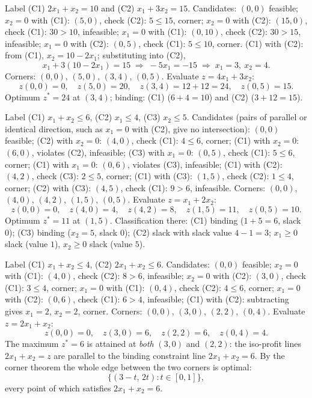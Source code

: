 \begin{solutions}
  \item Label (C1) $2x_{1}+x_{2}=10$ and (C2) $x_{1}+3x_{2}=15$.
        Candidates: $(0,0)$ feasible; $x_{2}=0$ with (C1): $(5,0)$,
        check (C2): $5\le 15$, corner; $x_{2}=0$ with (C2): $(15,0)$,
        check (C1): $30>10$, infeasible; $x_{1}=0$ with (C1): $(0,10)$,
        check (C2): $30>15$, infeasible; $x_{1}=0$ with (C2): $(0,5)$,
        check (C1): $5\le 10$, corner. (C1) with (C2): from (C1),
        $x_{2}=10-2x_{1}$; substituting into (C2),
        \[
          x_{1}+3(10-2x_{1})=15
          \;\Longrightarrow\; -5x_{1}=-15
          \;\Longrightarrow\; x_{1}=3,\ x_{2}=4 .
        \]
        Corners: $(0,0)$, $(5,0)$, $(3,4)$, $(0,5)$. Evaluate
        $z=4x_{1}+3x_{2}$:
        \[
          z(0,0)=0,\quad z(5,0)=20,\quad z(3,4)=12+12=24,\quad
          z(0,5)=15 .
        \]
        Optimum $z^{*}=24$ at $(3,4)$; binding: (C1) ($6+4=10$) and
        (C2) ($3+12=15$).

  \item Label (C1) $x_{1}+x_{2}\le 6$, (C2) $x_{1}\le 4$, (C3)
        $x_{2}\le 5$. Candidates (pairs of parallel or identical
        direction, such as $x_{1}=0$ with (C2), give no intersection):
        $(0,0)$ feasible; (C2) with $x_{2}=0$: $(4,0)$, check (C1):
        $4\le 6$, corner; (C1) with $x_{2}=0$: $(6,0)$, violates (C2),
        infeasible; (C3) with $x_{1}=0$: $(0,5)$, check (C1): $5\le 6$,
        corner; (C1) with $x_{1}=0$: $(0,6)$, violates (C3), infeasible;
        (C1) with (C2): $(4,2)$, check (C3): $2\le 5$, corner; (C1) with
        (C3): $(1,5)$, check (C2): $1\le 4$, corner; (C2) with (C3):
        $(4,5)$, check (C1): $9>6$, infeasible. Corners: $(0,0)$,
        $(4,0)$, $(4,2)$, $(1,5)$, $(0,5)$. Evaluate $z=x_{1}+2x_{2}$:
        \[
          z(0,0)=0,\quad z(4,0)=4,\quad z(4,2)=8,\quad z(1,5)=11,\quad
          z(0,5)=10 .
        \]
        Optimum $z^{*}=11$ at $(1,5)$. Classification there: (C1)
        binding ($1+5=6$, slack $0$); (C3) binding ($x_{2}=5$, slack
        $0$); (C2) slack with slack value $4-1=3$; $x_{1}\ge 0$ slack
        (value $1$), $x_{2}\ge 0$ slack (value $5$).

  \item Label (C1) $x_{1}+x_{2}\le 4$, (C2) $2x_{1}+x_{2}\le 6$.
        Candidates: $(0,0)$ feasible; $x_{2}=0$ with (C1): $(4,0)$,
        check (C2): $8>6$, infeasible; $x_{2}=0$ with (C2): $(3,0)$,
        check (C1): $3\le 4$, corner; $x_{1}=0$ with (C1): $(0,4)$,
        check (C2): $4\le 6$, corner; $x_{1}=0$ with (C2): $(0,6)$,
        check (C1): $6>4$, infeasible; (C1) with (C2): subtracting
        gives $x_{1}=2$, $x_{2}=2$, corner. Corners: $(0,0)$, $(3,0)$,
        $(2,2)$, $(0,4)$. Evaluate $z=2x_{1}+x_{2}$:
        \[
          z(0,0)=0,\quad z(3,0)=6,\quad z(2,2)=6,\quad z(0,4)=4 .
        \]
        The maximum $z^{*}=6$ is attained at \emph{both} $(3,0)$ and
        $(2,2)$: the iso-profit lines $2x_{1}+x_{2}=z$ are parallel to
        the binding constraint line $2x_{1}+x_{2}=6$. By the corner
        theorem the whole edge between the two corners is optimal:
        \[
          \{(3-t,\,2t):t\in[0,1]\},
        \]
        every point of which satisfies $2x_{1}+x_{2}=6$.


\end{solutions}
